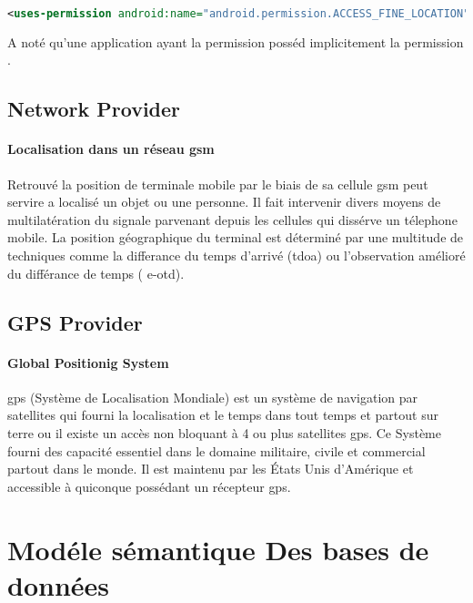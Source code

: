 \begin{lstlisting}[language=xml, caption=permission pour la localisation par GPS.]
<uses-permission android:name="android.permission.ACCESS_FINE_LOCATION"/>
\end{lstlisting}

A noté qu'une application ayant la permission  posséd implicitement la permission . 

\subsection{Network Provider}%

\paragraph{Localisation dans un réseau \gls{gsm} }
Retrouvé la position de terminale mobile par le biais de sa cellule \gls{gsm} peut servire a localisé un objet ou une personne. Il fait intervenir divers moyens de multilatération du signale parvenant depuis les cellules qui dissérve un télephone mobile. La position géographique du terminal est déterminé par une multitude de techniques comme la differance du temps d'arrivé (\gls{tdoa}) ou l'observation amélioré du différance de temps ( \gls{e-otd}).

\subsection{GPS Provider}%
\paragraph{Global Positionig System}\cite{enig:gps}
\gls{gps} (Système de Localisation Mondiale) est un système de navigation par satellites qui fourni la localisation et le temps dans tout temps et partout sur terre ou il existe un accès non bloquant à 4 ou plus satellites \gls{gps}. Ce Système fourni des capacité essentiel dans le domaine militaire, civile et commercial partout dans le monde. Il est maintenu par les États Unis d'Amérique et accessible à quiconque possédant un récepteur \gls{gps}.

\section{Modéle sémantique Des bases de données} 

